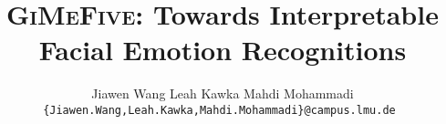\documentclass[10pt,twocolumn,letterpaper]{article}
\title{\textsc{GiMeFive}: Towards Interpretable Facial Emotion Recognitions}
\author{
Jiawen Wang
\qquad
Leah Kawka
\qquad
Mahdi Mohammadi \\
\tt\small\{Jiawen.Wang,Leah.Kawka,Mahdi.Mohammadi\}@campus.lmu.de
}
\begin{document}
\maketitle
    


{
    \small
    
    
}
\end{document}
